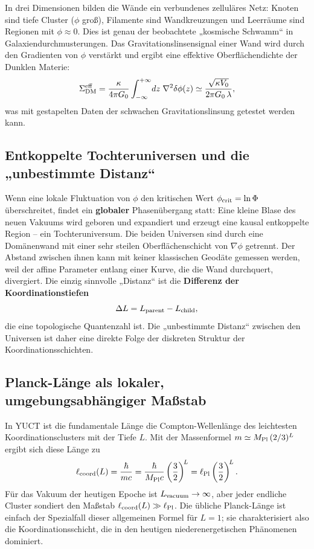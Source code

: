 \documentclass[12pt,a4paper]{article}
\begin{document}
	In drei Dimensionen bilden die Wände ein verbundenes zelluläres Netz: Knoten sind tiefe Cluster (\(\phi\) groß), Filamente sind Wandkreuzungen und Leerräume sind Regionen mit \(\phi \approx 0\). Dies ist genau der beobachtete „kosmische Schwamm“ in Galaxiendurchmusterungen. Das Gravitationslinsensignal einer Wand wird durch den Gradienten von \(\phi\) verstärkt und ergibt eine effektive Oberflächendichte der Dunklen Materie:
	\begin{equation}
		\Sigma_{\rm DM}^{\rm eff} = \frac{\kappa}{4\pi G_0} \int_{-\infty}^{+\infty} \!dz\; \nabla^2\delta\phi(z)
		\simeq \frac{\sqrt{\kappa V_0}}{2\pi G_0\,\lambda},
		\label{eq:wall-lensing}
	\end{equation}
	was mit gestapelten Daten der schwachen Gravitationslinsung getestet werden kann.
	
	\subsection{Entkoppelte Tochteruniversen und die „unbestimmte Distanz“}
	Wenn eine lokale Fluktuation von \(\phi\) den kritischen Wert \(\phi_{\rm crit}=\ln\Phi\) überschreitet, findet ein \textbf{globaler} Phasenübergang statt: Eine kleine Blase des neuen Vakuums wird geboren und expandiert und erzeugt eine kausal entkoppelte Region – ein Tochteruniversum. Die beiden Universen sind durch eine Domänenwand mit einer sehr steilen Oberflächenschicht von \(\nabla\phi\) getrennt. Der Abstand zwischen ihnen kann mit keiner klassischen Geodäte gemessen werden, weil der affine Parameter entlang einer Kurve, die die Wand durchquert, divergiert. Die einzig sinnvolle „Distanz“ ist die \textbf{Differenz der Koordinationstiefen}
	\begin{equation}
		\Delta L = L_{\rm parent} - L_{\rm child},
		\label{eq:deltaL}
	\end{equation}
	die eine topologische Quantenzahl ist. Die „unbestimmte Distanz“ zwischen den Universen ist daher eine direkte Folge der diskreten Struktur der Koordinationsschichten.
	
	\subsection{Planck-Länge als lokaler, umgebungsabhängiger Maßstab}
	In YUCT ist die fundamentale Länge die Compton-Wellenlänge des leichtesten Koordinationsclusters mit der Tiefe \(L\). Mit der Massenformel \(m \simeq M_{\rm Pl}\,(2/3)^L\) ergibt sich diese Länge zu
	\begin{equation}
		\ell_{\rm coord}(L) = \frac{\hbar}{m c}
		= \frac{\hbar}{M_{\rm Pl}c} \left(\frac{3}{2}\right)^{\!L}
		= \ell_{\rm Pl} \left(\frac{3}{2}\right)^{\!L}.
		\label{eq:length-from-L}
	\end{equation}
	Für das Vakuum der heutigen Epoche ist \(L_{\rm vacuum}\to\infty\), aber jeder endliche Cluster sondiert den Maßstab \(\ell_{\rm coord}(L) \gg \ell_{\rm Pl}\). Die übliche Planck-Länge ist einfach der Spezialfall dieser allgemeinen Formel für \(L=1\); sie charakterisiert also die Koordinationsschicht, die in den heutigen niederenergetischen Phänomenen dominiert.
	
\end{document}
